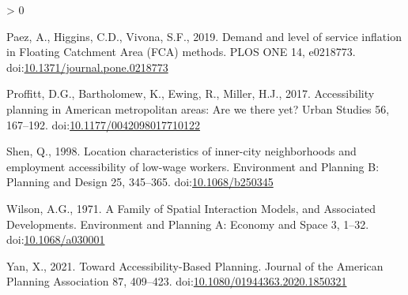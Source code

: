 \documentclass[]{elsarticle} %
\newlength{\cslhangindent}
\newenvironment{CSLReferences}[2] %
 {%
  \setlength{\parindent}{0pt}
  \ifodd #1 \everypar{\setlength{\hangindent}{\cslhangindent}}\ignorespaces\fi
  \ifnum #2 > 0
  \setlength{\parskip}{#2\baselineskip}
  \fi
 }%
 {}
\begin{document}
\begin{CSLReferences}{1}{0}
\leavevmode\hypertarget{ref-paez2019}{}%
Paez, A., Higgins, C.D., Vivona, S.F., 2019. Demand and level of service
inflation in Floating Catchment Area (FCA) methods. PLOS ONE 14,
e0218773.
doi:\href{https://doi.org/10.1371/journal.pone.0218773}{10.1371/journal.pone.0218773}

\leavevmode\hypertarget{ref-proffitt2017}{}%
Proffitt, D.G., Bartholomew, K., Ewing, R., Miller, H.J., 2017.
Accessibility planning in American metropolitan areas: Are we there yet?
Urban Studies 56, 167--192.
doi:\href{https://doi.org/10.1177/0042098017710122}{10.1177/0042098017710122}

\leavevmode\hypertarget{ref-shen1998}{}%
Shen, Q., 1998. Location characteristics of inner-city neighborhoods and
employment accessibility of low-wage workers. Environment and Planning
B: Planning and Design 25, 345--365.
doi:\href{https://doi.org/10.1068/b250345}{10.1068/b250345}

\leavevmode\hypertarget{ref-wilson1971}{}%
Wilson, A.G., 1971. A Family of Spatial Interaction Models, and
Associated Developments. Environment and Planning A: Economy and Space
3, 1--32. doi:\href{https://doi.org/10.1068/a030001}{10.1068/a030001}

\leavevmode\hypertarget{ref-yan2021}{}%
Yan, X., 2021. Toward Accessibility-Based Planning. Journal of the
American Planning Association 87, 409--423.
doi:\href{https://doi.org/10.1080/01944363.2020.1850321}{10.1080/01944363.2020.1850321}

\end{CSLReferences}
\end{document}

